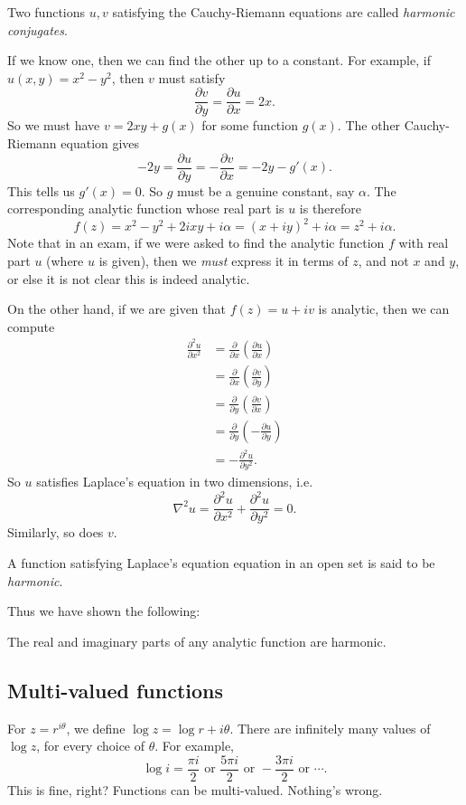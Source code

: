 \documentclass[a4paper]{article}
\begin{document}
\begin{defi}
  Two functions $u, v$ satisfying the Cauchy-Riemann equations are called \emph{harmonic conjugates}.
\end{defi}

If we know one, then we can find the other up to a constant. For example, if $u(x, y) = x^2 - y^2$, then $v$ must satisfy
\[
  \frac{\partial v}{\partial y} = \frac{\partial u}{\partial x} = 2x.
\]
So we must have $v = 2xy + g(x)$ for some function $g(x)$. The other Cauchy-Riemann equation gives
\[
  -2y = \frac{\partial u}{\partial y} = -\frac{\partial v}{\partial x} = -2y - g'(x).
\]
This tells us $g'(x) = 0$. So $g$ must be a genuine constant, say $\alpha$. The corresponding analytic function whose real part is $u$ is therefore
\[
  f(z) = x^2 - y^2 + 2ixy + i\alpha = (x + iy)^2 + i \alpha = z^2 + i\alpha.
\]
Note that in an exam, if we were asked to find the analytic function $f$ with real part $u$ (where $u$ is given), then we \emph{must} express it in terms of $z$, and not $x$ and $y$, or else it is not clear this is indeed analytic.

On the other hand, if we are given that $f(z) = u + iv$ is analytic, then we can compute
\begin{align*}
  \frac{\partial^2 u}{\partial x^2} &= \frac{\partial }{\partial x}\left(\frac{\partial u}{\partial x}\right)\\
  &= \frac{\partial }{\partial x} \left(\frac{\partial v}{\partial y}\right)\\
  &= \frac{\partial }{\partial y}\left(\frac{\partial v}{\partial x}\right)\\
  &= \frac{\partial }{\partial y}\left(- \frac{\partial u}{\partial y}\right)\\
  &= -\frac{\partial^2 u}{\partial y^2}.
\end{align*}
So $u$ satisfies Laplace's equation in two dimensions, i.e.
\[
  \nabla^2 u = \frac{\partial^2 u}{\partial x^2} + \frac{\partial^2 u}{\partial y^2} = 0.
\]
Similarly, so does $v$.
\begin{defi}
  A function satisfying Laplace's equation equation in an open set is said to be \emph{harmonic}.
\end{defi}

Thus we have shown the following:
\begin{prop}
  The real and imaginary parts of any analytic function are harmonic.
\end{prop}

\subsection{Multi-valued functions}
For $z = r^{i\theta}$, we define $\log z = \log r + i \theta$. There are infinitely many values of $\log z$, for every choice of $\theta$. For example,
\[
  \log i = \frac{\pi i}{2} \text{ or }\frac{5\pi i}{2}\text{ or } -\frac{3\pi i}{2}\text{ or }\cdots.
\]
This is fine, right? Functions can be multi-valued. Nothing's wrong.
\end{document}
